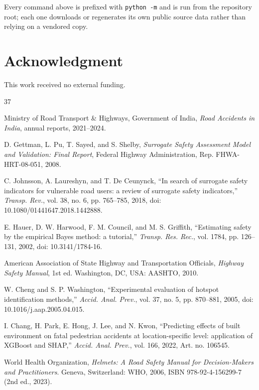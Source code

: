 \documentclass[journal]{IEEEtran}
\begin{document}
Every command above is prefixed with \texttt{python -m} and is run from the repository root; each one downloads or regenerates its own public source data rather than relying on a vendored copy.

\section*{Acknowledgment}
This work received no external funding.

\begin{thebibliography}{37}

 Ministry of Road Transport \& Highways, Government of India, \emph{Road Accidents in India}, annual reports, 2021--2024.

 D. Gettman, L. Pu, T. Sayed, and S. Shelby, \emph{Surrogate Safety Assessment Model and Validation: Final Report}, Federal Highway Administration, Rep. FHWA-HRT-08-051, 2008.

 C. Johnsson, A. Laureshyn, and T. De Ceunynck, ``In search of surrogate safety indicators for vulnerable road users: a review of surrogate safety indicators,'' \emph{Transp. Rev.}, vol. 38, no. 6, pp. 765--785, 2018, doi: 10.1080/01441647.2018.1442888.

 E. Hauer, D. W. Harwood, F. M. Council, and M. S. Griffith, ``Estimating safety by the empirical Bayes method: a tutorial,'' \emph{Transp. Res. Rec.}, vol. 1784, pp. 126--131, 2002, doi: 10.3141/1784-16.

 American Association of State Highway and Transportation Officials, \emph{Highway Safety Manual}, 1st ed. Washington, DC, USA: AASHTO, 2010.

 W. Cheng and S. P. Washington, ``Experimental evaluation of hotspot identification methods,'' \emph{Accid. Anal. Prev.}, vol. 37, no. 5, pp. 870--881, 2005, doi: 10.1016/j.aap.2005.04.015.

 I. Chang, H. Park, E. Hong, J. Lee, and N. Kwon, ``Predicting effects of built environment on fatal pedestrian accidents at location-specific level: application of XGBoost and SHAP,'' \emph{Accid. Anal. Prev.}, vol. 166, 2022, Art. no. 106545.

 World Health Organization, \emph{Helmets: A Road Safety Manual for Decision-Makers and Practitioners}. Geneva, Switzerland: WHO, 2006, ISBN 978-92-4-156299-7 (2nd ed., 2023).


\end{thebibliography}
\end{document}
